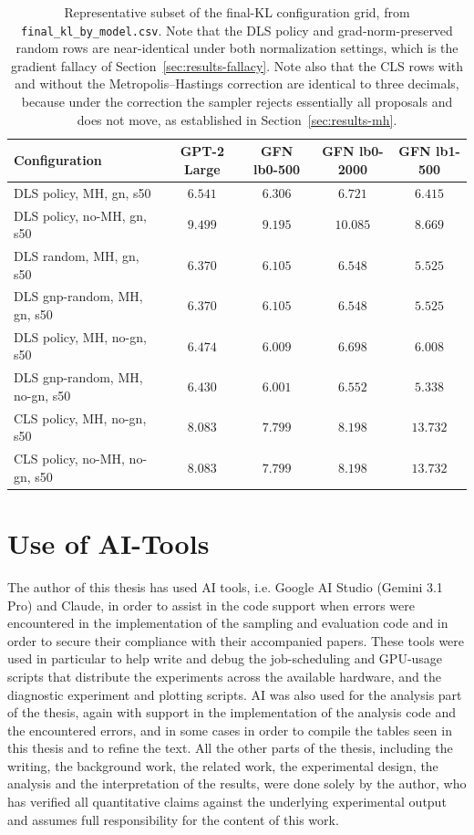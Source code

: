 \begin{table}[h]
    \centering
    \small
    \begin{tabular}{lcccc}
        \toprule
        Configuration & GPT-2 Large & GFN lb0-500 & GFN lb0-2000 & GFN lb1-500 \\
        \midrule
        DLS policy, MH, gn, s50        & $6.541$ & $6.306$ & $6.721$ & $6.415$ \\
        DLS policy, no-MH, gn, s50     & $9.499$ & $9.195$ & $10.085$ & $8.669$ \\
        DLS random, MH, gn, s50        & $6.370$ & $6.105$ & $6.548$ & $5.525$ \\
        DLS gnp-random, MH, gn, s50    & $6.370$ & $6.105$ & $6.548$ & $5.525$ \\
        DLS policy, MH, no-gn, s50     & $6.474$ & $6.009$ & $6.698$ & $6.008$ \\
        DLS gnp-random, MH, no-gn, s50 & $6.430$ & $6.001$ & $6.552$ & $5.338$ \\
        CLS policy, MH, no-gn, s50     & $8.083$ & $7.799$ & $8.198$ & $13.732$ \\
        CLS policy, no-MH, no-gn, s50  & $8.083$ & $7.799$ & $8.198$ & $13.732$ \\
        \bottomrule
    \end{tabular}
    \caption{Representative subset of the final-KL configuration grid, from \texttt{final\_kl\_by\_model.csv}. Note that the DLS policy and grad-norm-preserved random rows are near-identical under both normalization settings, which is the gradient fallacy of Section~\ref{sec:results-fallacy}. Note also that the CLS rows with and without the Metropolis--Hastings correction are identical to three decimals, because under the correction the sampler rejects essentially all proposals and does not move, as established in Section~\ref{sec:results-mh}.}
    \label{tab:full-grid}
\end{table}

\clearpage
\section{Use of AI-Tools}
\label{app:ai-tools}

The author of this thesis has used AI tools, i.e. Google AI Studio (Gemini 3.1 Pro) and Claude, in order to assist in the code support when errors were encountered in the implementation of the sampling and evaluation code and in order to secure their compliance with their accompanied papers. These tools were used in particular to help write and debug the job-scheduling and GPU-usage scripts that distribute the experiments across the available hardware, and the diagnostic experiment and plotting scripts. AI was also used for the analysis part of the thesis, again with support in the implementation of the analysis code and the encountered errors, and in some cases in order to compile the tables seen in this thesis and to refine the text. All the other parts of the thesis, including the writing, the background work, the related work, the experimental design, the analysis and the interpretation of the results, were done solely by the author, who has verified all quantitative claims against the underlying experimental output and assumes full responsibility for the content of this work.

